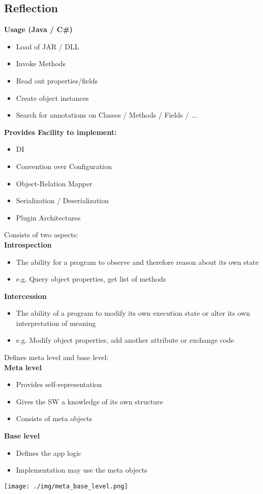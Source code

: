 \subsection{Reflection}
\textbf{Usage (Java / C\#)}
\begin{itemize}
    \item Load of JAR / DLL
    \item Invoke Methods 
    \item Read out properties/fields 
    \item Create object instances 
    \item Search for annotations on Classes / Methods / Fields / ...
\end{itemize}
\textbf{Provides Facility to implement:}
\begin{itemize}
    \item DI
    \item Convention over Configuration
    \item Object-Relation Mapper
    \item Serialization / Deserialization
    \item Plugin Architectures
\end{itemize}
Consists of two aspects:\\ 
\textbf{Introspection}
\begin{itemize}
    \item The ability for a program to observe and therefore reason about its own state
    \item e.g. Query object properties, get list of methods
\end{itemize}
\textbf{Intercession}
\begin{itemize}
    \item The ability of a program to modify its own execution state or alter its own interpretation of meaning
    \item e.g. Modify object properties, add another attribute or exchange code
\end{itemize}
Defines meta level and base level:\\ 
\textbf{Meta level}
\begin{itemize}
    \item Provides self-representation
    \item Gives the SW a knowledge of its own structure
    \item Consists of meta objects
\end{itemize}
\textbf{Base level}
\begin{itemize}
    \item Defines the app logic
    \item Implementation may use the meta objects
\end{itemize}
\texttt{[image: ./img/meta\_base\_level.png]}
